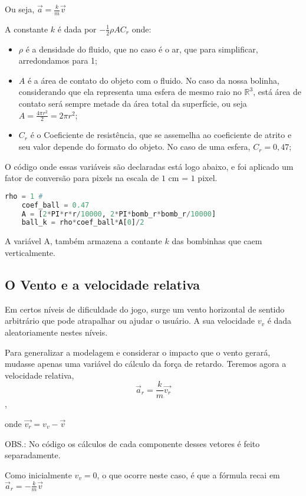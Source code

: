 \documentclass[12pt,letterpaper]{article}
\begin{document}
Ou seja, $\vec{a}=\displaystyle\frac k m \vec{v}$

A constante $k$ é dada por $-\displaystyle\frac12\rho A C_r$ onde:

\begin{itemize}
    \item $\rho$ é a densidade do fluido, que no caso é o ar, que para simplificar, arredondamos para 1;
    \item $A$ é a área de contato do objeto com o fluido. No caso da nossa bolinha, considerando que ela representa uma esfera de mesmo raio no $\mathbb{R}^3$, está área de contato será sempre metade da área total da superfície, ou seja $A=\displaystyle\frac{4\pi r^2}2=2\pi r^2$;
    \item $C_r$ é o Coeficiente de resistência, que se assemelha ao coeficiente de atrito e seu valor depende do formato do objeto. No caso de uma esfera, $C_r=0,47$;
    
\end{itemize}
O código onde essas variáveis são declaradas está logo abaixo, e foi aplicado um fator de conversão para pixels na escala de $1$ cm = $1$ pixel.
\begin{lstlisting}[language=Python,caption={Variáveis para resistência do ar}]
    rho = 1 #
    coef_ball = 0.47
    A = [2*PI*r*r/10000, 2*PI*bomb_r*bomb_r/10000]
    ball_k = rho*coef_ball*A[0]/2
\end{lstlisting}

A variável A, também armazena a contante $k$ das bombinhas que caem verticalmente.

\subsection*{O Vento e a velocidade relativa}

Em certos níveis de dificuldade do jogo, surge um vento horizontal de sentido arbitrário que pode atrapalhar ou ajudar o usuário. A sua velocidade $v_v$ é dada aleatoriamente nestes níveis.

Para generalizar a modelagem e considerar o impacto que o vento gerará, mudasse apenas uma variável do cálculo da força de retardo. Teremos agora a velocidade relativa,
$$\vec{a}_r=\displaystyle\frac k m\vec{v_r}$$,

onde $\vec{v_r}=v_v-\vec{v}$

OBS.: No código os cálculos de cada componente desses vetores é feito separadamente.

Como inicialmente $v_v=0$, o que ocorre neste caso, é que a fórmula recai em $\vec{a}_r=-\displaystyle\frac k m\vec{v}$
\end{document}
